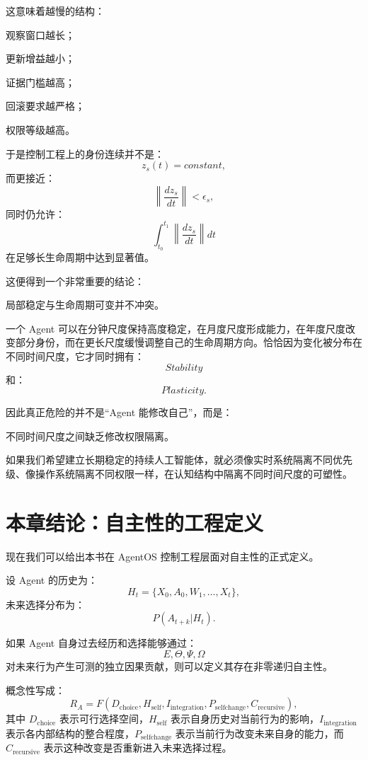 这意味着越慢的结构：

观察窗口越长；

更新增益越小；

证据门槛越高；

回滚要求越严格；

权限等级越高。

于是控制工程上的身份连续并不是：
\[
z_s(t)=constant,
\]
而更接近：
\[
\left\|
\frac{dz_s}{dt}
\right\|
<
\epsilon_s,
\]
同时仍允许：
\[
\int_{t_0}^{t_1}
\left\|
\frac{dz_s}{dt}
\right\|
dt
\]
在足够长生命周期中达到显著值。

这便得到一个非常重要的结论：

\begin{conclusion}
局部稳定与生命周期可变并不冲突。
\end{conclusion}

一个 Agent 可以在分钟尺度保持高度稳定，在月度尺度形成能力，在年度尺度改变部分身份，而在更长尺度缓慢调整自己的生命周期方向。恰恰因为变化被分布在不同时间尺度，它才同时拥有：
\[
Stability
\]
和：
\[
Plasticity.
\]

因此真正危险的并不是“Agent 能修改自己”，而是：
\begin{statementbox}
不同时间尺度之间缺乏修改权限隔离。
\end{statementbox}

如果我们希望建立长期稳定的持续人工智能体，就必须像实时系统隔离不同优先级、像操作系统隔离不同权限一样，在认知结构中隔离不同时间尺度的可塑性。

\section{本章结论：自主性的工程定义}

现在我们可以给出本书在 AgentOS 控制工程层面对自主性的正式定义。

设 Agent 的历史为：
\[
H_t
=
\{X_0,A_0,W_1,\ldots,X_t\},
\]
未来选择分布为：
\[
P(A_{t+k}|H_t).
\]

如果 Agent 自身过去经历和选择能够通过：
\[
E,\Theta,\Psi,\Omega
\]
对未来行为产生可测的独立因果贡献，则可以定义其存在非零递归自主性。

概念性写成：
\[
\boxed{
R_A
=
F(
D_{\mathrm{choice}},
H_{\mathrm{self}},
I_{\mathrm{integration}},
P_{\mathrm{selfchange}},
C_{\mathrm{recursive}}
),
}
\]
其中 $D_{\mathrm{choice}}$ 表示可行选择空间，$H_{\mathrm{self}}$ 表示自身历史对当前行为的影响，$I_{\mathrm{integration}}$ 表示各内部结构的整合程度，$P_{\mathrm{selfchange}}$ 表示当前行为改变未来自身的能力，而 $C_{\mathrm{recursive}}$ 表示这种改变是否重新进入未来选择过程。

